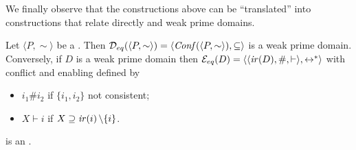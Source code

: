 We finally observe that the constructions above can be ``translated'' 
into constructions that relate directly {\eseqabbr} and weak prime domains.
%
%

\begin{proposition}
  \label{pr:wpd-eseq}
  Let $\langle P, \sim \rangle$ be a {\eseqabbr}. Then
  $\mathcal{D}_{eq}({\langle P, \sim \rangle}) = \langle  \mathit{Conf}({\langle P, \sim \rangle}), \subseteq \rangle$ 
  is a weak prime domain.
  Conversely, if $D$ is a weak prime domain then
  $\mathcal{E}_{eq}({D}) = \langle \langle \mathop{\mathit{ir}({D})}, \#, \vdash \rangle,
  \leftrightarrow^* \rangle$ with conflict and enabling defined by
  \begin{itemize}
  \item $i_1 \# i_2$ if $\{ i_1, i_2\}$ not consistent;
  \item $X \vdash i$ if
    $X \supseteq \mathop{\mathit{ir}({i})}\setminus\{i\}$.
  \end{itemize}
  is an {\eseqabbr}.
\end{proposition}

